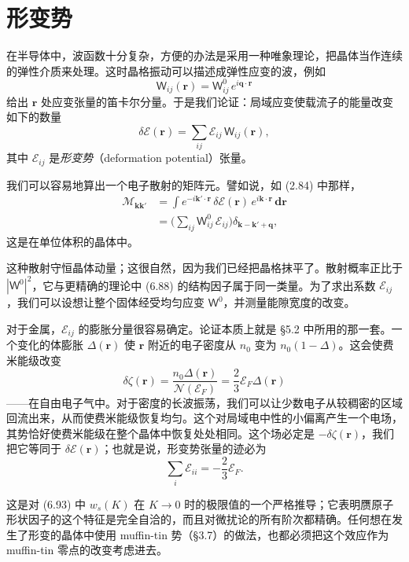 \section{形变势}

在半导体中，波函数十分复杂，方便的办法是采用一种唯象理论，把晶体当作连续的弹性介质来处理。这时晶格振动可以描述成弹性应变的波，例如
\begin{equation*}
\mathsf{W}_{ij}(\mathbf{r}) = \mathsf{W}_{ij}^{0}\,e^{i\mathbf{q}\cdot\mathbf{r}} \tag{6.94}
\end{equation*}
给出 $\mathbf{r}$ 处应变张量的笛卡尔分量。于是我们论证：局域应变使载流子的能量改变如下的数量
\begin{equation*}
\delta\mathcal{E}(\mathbf{r}) = \sum_{ij}\mathcal{E}_{ij}\,\mathsf{W}_{ij}(\mathbf{r}), \tag{6.95}
\end{equation*}
其中 $\mathcal{E}_{ij}$ 是\emph{形变势}（deformation potential）张量。

我们可以容易地算出一个电子散射的矩阵元。譬如说，如 (2.84) 中那样，
\begin{align*}
\mathcal{M}_{\mathbf{k}\mathbf{k}'} &= \int e^{-i\mathbf{k}'\cdot\mathbf{r}}\,\delta\mathcal{E}(\mathbf{r})\,e^{i\mathbf{k}\cdot\mathbf{r}}\,\mathbf{dr} \\
&= \bigl(\sum_{ij}\mathsf{W}_{ij}^{0}\,\mathcal{E}_{ij}\bigr)\delta_{\mathbf{k}-\mathbf{k}'+\mathbf{q}}, \tag{6.96}
\end{align*}
这是在单位体积的晶体中。

这种散射守恒晶体动量；这很自然，因为我们已经把晶格抹平了。散射概率正比于 $|\mathsf{W}^{0}|^{2}$，它与更精确的理论中 (6.88) 的结构因子属于同一类量。为了求出系数 $\mathcal{E}_{ij}$，我们可以设想让整个固体经受均匀应变 $\mathsf{W}^{0}$，并测量能隙宽度的改变。

对于金属，$\mathcal{E}_{ij}$ 的膨胀分量很容易确定。论证本质上就是 §5.2 中所用的那一套。一个变化的体膨胀 $\Delta(\mathbf{r})$ 使 $\mathbf{r}$ 附近的电子密度从 $n_{0}$ 变为 $n_{0}(1-\Delta)$。这会使费米能级改变
\begin{equation*}
\delta\zeta(\mathbf{r}) = \frac{n_{0}\Delta(\mathbf{r})}{\mathcal{N}(\mathcal{E}_{F})} = \frac{2}{3}\mathcal{E}_{F}\Delta(\mathbf{r}) \tag{6.97}
\end{equation*}
——在自由电子气中。对于密度的长波振荡，我们可以让少数电子从较稠密的区域回流出来，从而使费米能级恢复均匀。这个对局域电中性的小偏离产生一个电场，其势恰好使费米能级在整个晶体中恢复处处相同。这个场必定是 $-\delta\zeta(\mathbf{r})$，我们把它等同于 $\delta\mathcal{E}(\mathbf{r})$；也就是说，形变势张量的迹必为
\begin{equation*}
\sum_{i}\mathcal{E}_{ii} = -\frac{2}{3}\mathcal{E}_{F}. \tag{6.98}
\end{equation*}


这是对 (6.93) 中 $w_{s}(K)$ 在 $K \rightarrow 0$ 时的极限值的一个严格推导；它表明赝原子形状因子的这个特征是完全自洽的，而且对微扰论的所有阶次都精确。任何想在发生了形变的晶体中使用 muffin-tin 势（§3.7）的做法，也都必须把这个效应作为 muffin-tin 零点的改变考虑进去。
